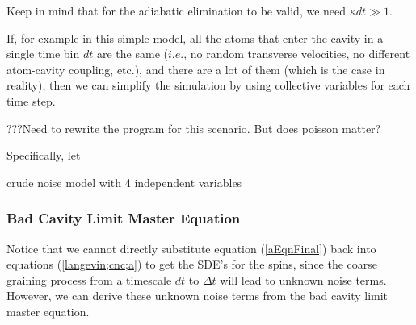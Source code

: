 \documentclass{article}
\begin{document}
Keep in mind that for the adiabatic elimination to be valid, we need $\kappa dt \gg 1$.

If, for example in this simple model, all the atoms that enter the cavity in a single time bin $dt$ are the same ($i.e.$, no random transverse velocities, no different atom-cavity coupling, etc.), and there are a lot of them (which is the case in reality), then we can simplify the simulation by using collective variables for each time step.

???Need to rewrite the program for this scenario. But does poisson matter?

Specifically, let 

crude noise model with 4 independent variables


\subsubsection{Bad Cavity Limit Master Equation}
Notice that we cannot directly substitute equation (\ref{aEqnFinal}) back into equations (\ref{langevin;cnc;a}) to get the SDE's for the spins, since the coarse graining process from a timescale $dt$ to $\Delta t$ will lead to unknown noise terms. However, we can derive these unknown noise terms from the bad cavity limit master equation. 




\end{document}
